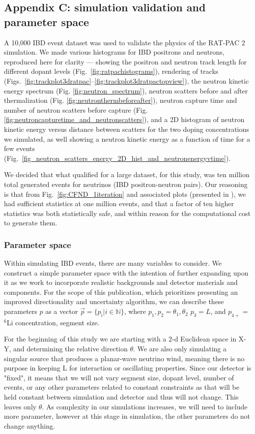 \documentclass[tightenlines,twocolumn,prl,notitlepage,nofootinbib,preprintnumbers,longbibliography]{revtex4-1}
\begin{document}
\subsection{Appendix C: simulation validation and parameter space}
\label{app:phys_validation}
A 10,000 IBD event dataset was used to validate the physics of the RAT-PAC 2 simulation. We made various histograms for IBD positrons and neutrons, reproduced here for clarity --- showing the positron and neutron track length for different dopant levels (Fig.~\ref{fig:ratpachistograms}), rendering of tracks (Figs.~\ref{fig:trackplot3dratpac}--\ref{fig:trackplot3dratpactopview}), the neutron kinetic energy spectrum (Fig. \ref{fig:neutron_spectrum}), neutron scatters before and after thermalization (Fig. \ref{fig:neutronthermbeforeafter}), neutron capture time and number of neutron scatters before capture (Fig. \ref{fig:neutroncapturetime_and_neutronscatters}), and a 2D histogram of neutron kinetic energy versus distance between scatters for the two doping concentrations we simulated, as well showing a neutron kinetic energy as a function of time for a few events (Fig.~\ref{fig_neutron_scatters_energy_2D_hist_and_neutronenergyvtime}). 

We decided that what qualified for a large dataset, for this study, was ten million total generated events for neutrinos (IBD positron-neutron pairs). Our reasoning is that from Fig.~\ref{fig:CFND_1iteration} and associated plots (presented in \cite{10.1063/5.0315079}), we had sufficient statistics at one million events, and that a factor of ten higher statistics was both statistically safe, and within reason for the computational cost to generate them.


\subsubsection{Parameter space}
Within simulating IBD events, there are many variables to consider. We construct a simple parameter space with the intention of further expanding upon it as we work to incorporate realistic backgrounds and detector materials and components. For the scope of this publication, which  prioritizes presenting an improved directionality and uncertainty algorithm, we can describe these parameters $p$ as a vector $\vec{p} = \{p_i|i\in\mathbb{N}\}$, where $p_1,p_2 = \theta_1,\theta_2$ $p_3 = L$, and $p_{4+}$ = $^6$Li concentration, segment size.

For the beginning of this study we are starting with a 2-d Euclidean space in X-Y, and determining the relative direction $\theta$. We are also only simulating a singular source that produces a planar-wave neutrino wind, meaning there is no purpose in keeping L for interaction or oscillating properties. Since our detector is "fixed", it means that we will not vary segment size, dopant level, number of events, or any other parameters related to constant constraints as that will be held constant between simulation and detector and thus will not change. This leaves only $\theta$. As complexity in our simulations increases, we will need to include more parameter, however at this stage in simulation, the other parameters do not change anything.
\end{document}

